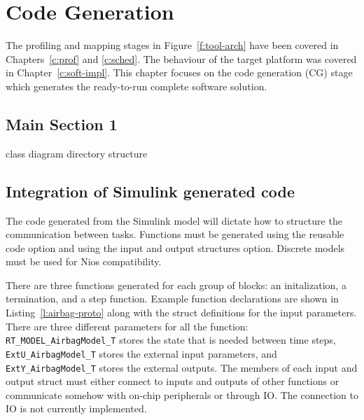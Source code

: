 
\chapter{Code Generation} %


	The profiling and mapping stages in Figure~\ref{f:tool-arch} have been covered in Chapters~\ref{c:prof} and \ref{c:sched}. 
	The behaviour of the target platform was covered in Chapter~\ref{c:soft-impl}. 
	This chapter focuses on the code generation (CG) stage which generates the ready-to-run complete software solution.
\label{c:code-gen} %


\section{Main Section 1}

class diagram
directory structure



\section{Integration of Simulink generated code}

The code generated from the Simulink model will dictate how to structure the communication between tasks. Functions must be generated using the reusable code option and using the input and output structures option. Discrete models must be used for Nios compatibility.

There are three functions generated for each group of blocks: an initalization, a termination, and a step function. Example function declarations are shown in Listing~\ref{l:airbag-proto} along with the struct definitions for the input parameters. There are three different parameters for all the function: 
\texttt{RT\_MODEL\_AirbagModel\_T} stores the state that is needed between time steps, \texttt{ExtU\_AirbagModel\_T} stores the external input parameters, and \texttt{ExtY\_AirbagModel\_T} stores the external outputs. The members of each input and output struct must either connect to inputs and outputs of other functions or communicate somehow with on-chip peripherals or through IO. The connection to IO is not currently implemented.

